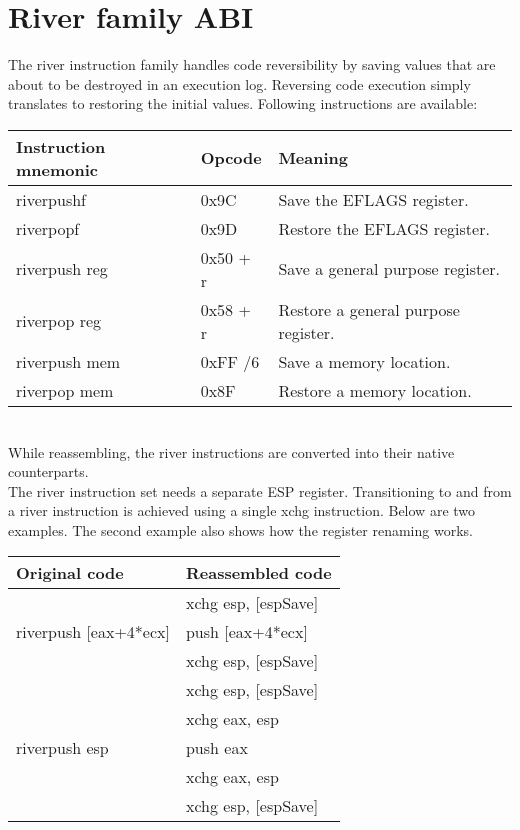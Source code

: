 \documentclass[12pt]{report}
\begin{document}
\section{River family ABI}
\label{sec:river-family-abi}
The river instruction family handles code reversibility by saving values that are about to be destroyed in an execution log. Reversing code execution simply translates to restoring the initial values. Following instructions are available:\\
\begin{tabular}{| l | l | l |}
	\hline
	\textbf{Instruction mnemonic} & \textbf{Opcode} & \textbf{Meaning} \\ \hline
	riverpushf & 0x9C & Save the EFLAGS register.\\ \hline
	riverpopf & 0x9D & Restore the EFLAGS register.\\ \hline
	riverpush reg & 0x50 + r & Save a general purpose register.\\ \hline
	riverpop reg & 0x58 + r & Restore a general purpose register.\\ \hline
	riverpush mem & 0xFF /6 & Save a memory location.\\ \hline
	riverpop mem & 0x8F & Restore a memory location.\\ \hline
\end{tabular}\\
While reassembling, the river instructions are converted into their native counterparts.\\
\newline
The river instruction set needs a separate ESP register. Transitioning to and from a river instruction is achieved using a single xchg instruction. Below are two examples. The second example also shows how the register renaming works.\\
\newline
\begin{tabular}{| l | l |}
	\hline
	\textbf{Original code} & \textbf{Reassembled code}\\ \hline
	\multirow{3}{*}{riverpush [eax+4*ecx]} & xchg esp, [espSave]\\
    & push [eax+4*ecx]\\
	& xchg esp, [espSave]\\ \hline
	\multirow{5}{*}{riverpush esp} & xchg esp, [espSave]\\
	& xchg eax, esp\\
	& push eax\\
	& xchg eax, esp\\
	& xchg esp, [espSave]\\ \hline
\end{tabular}\\
\end{document}
